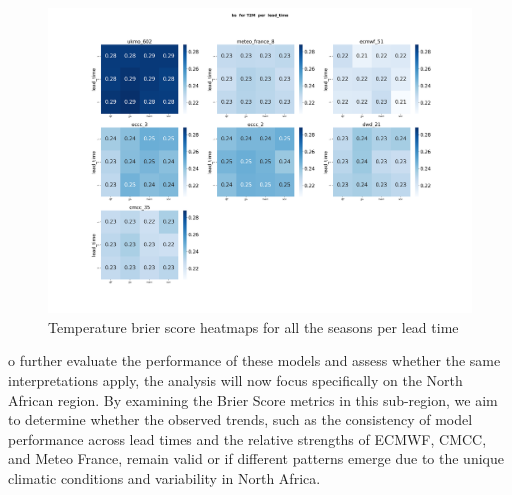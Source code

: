 \begin{figure}[H]
    \centering
    \includegraphics[width=1\linewidth]{plots/prob/bs/bs_T2M_lead_time.png}
    \caption{Temperature brier score heatmaps for all the seasons per lead time}
\end{figure}
o further evaluate the performance of these models and assess whether the same interpretations apply, the analysis will now focus specifically on the North African region. By examining the Brier Score metrics in this sub-region, we aim to determine whether the observed trends, such as the consistency of model performance across lead times and the relative strengths of ECMWF, CMCC, and Meteo France, remain valid or if different patterns emerge due to the unique climatic conditions and variability in North Africa.


